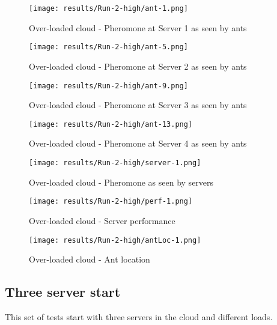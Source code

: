 \begin{figure}[!ht]
	\centering
		\texttt{[image: results/Run-2-high/ant-1.png]}
	\caption{Over-loaded cloud - Pheromone at Server 1 as seen by ants}
	\label{fig:2serv-ant1-high}
\end{figure}

\begin{figure}
	\centering
		\texttt{[image: results/Run-2-high/ant-5.png]}
	\caption{Over-loaded cloud - Pheromone at Server 2 as seen by ants}
	\label{fig:2serv-ant5-high}
\end{figure}

\begin{figure}
	\centering
		\texttt{[image: results/Run-2-high/ant-9.png]}
	\caption{Over-loaded cloud - Pheromone at Server 3 as seen by ants}
	\label{fig:2serv-ant9-high}
\end{figure}

\begin{figure}
	\centering
		\texttt{[image: results/Run-2-high/ant-13.png]}
	\caption{Over-loaded cloud - Pheromone at Server 4 as seen by ants}
	\label{fig:2serv-ant13-high}
\end{figure}

\begin{figure}
	\centering
		\texttt{[image: results/Run-2-high/server-1.png]}
	\caption{Over-loaded cloud - Pheromone as seen by servers}
	\label{fig:2serv-pher-high}
\end{figure}

\begin{figure}
	\centering
		\texttt{[image: results/Run-2-high/perf-1.png]}
	\caption{Over-loaded cloud - Server performance}
	\label{fig:2serv-perf-high}
\end{figure}

\begin{figure}
	\centering
		\texttt{[image: results/Run-2-high/antLoc-1.png]}
	\caption{Over-loaded cloud - Ant location}
	\label{fig:2serv-antloc-high}
\end{figure}

\subsection{Three server start}

This set of tests start with three servers in the cloud and different loads.

